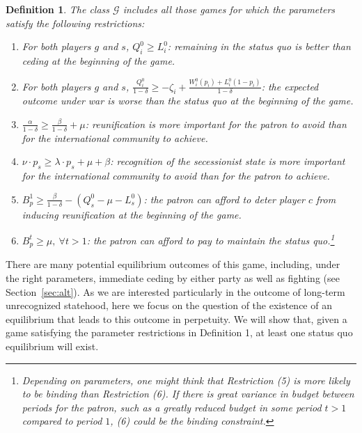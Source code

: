 \documentclass[11pt,letterpaper, notitlepage]{article}
\newtheorem{definition}{Definition}
\newcommand{\de}{\delta}
\begin{document}
\begin{definition}
\emph{The class $\mathcal{G}$ includes all those games for which the parameters satisfy the following restrictions:}

\begin{enumerate}
\item \textit{For both players $g$ and $s$, $Q_i^0 \geq L_i^0$: remaining in the status quo is better than ceding at the beginning of the game.}

\item \textit{For both players $g$ and $s$, $\frac {Q_i^0}{1-\delta} \geq  -\zeta_i+\frac{W_i^0(p_i) + L_i^0(1-p_i)}{1-\delta}$: the expected outcome under war is worse than the status quo at the beginning of the game.}

\item \textit{$\frac{\alpha}{1-\de} \geq \frac{\beta}{1-\de} + \mu$: reunification is more important for the patron to avoid than for the international community to achieve.}

\item  \textit{$\nu\cdot p_s \geq \lambda \cdot p_s + \mu + \beta$: recognition of the secessionist state is more important for the international community to avoid than for the patron to achieve.}

\item  \textit{$B_p^1 \geq\frac{\beta}{1-\delta} - \left(Q_s^0 -\mu - L_s^0 \right)$: the patron can afford to deter player $c$ from inducing reunification at the beginning of the game.}

\item \textit{$B_p^t \geq \mu, \ \forall t>1$: the patron can afford to pay to maintain the status quo.}\footnote{Depending on parameters, one might think that Restriction (5) is more likely to be binding than Restriction (6). If there is great variance in budget between periods for the patron, such as a greatly reduced budget in some period $t> 1$ compared to period $1$, (6) could be the binding constraint.}

\end{enumerate}
\end{definition}

There are many potential equilibrium outcomes of this game, including, under the right parameters, immediate ceding by either party as well as fighting (see Section~\ref{sec:alt}). As we are interested particularly in the outcome of long-term unrecognized statehood, here we focus on the question of the existence of an equilibrium that leads to this outcome in perpetuity. We will show that, given a game satisfying the parameter restrictions in Definition 1, at least one status quo equilibrium will exist.
\end{document}
